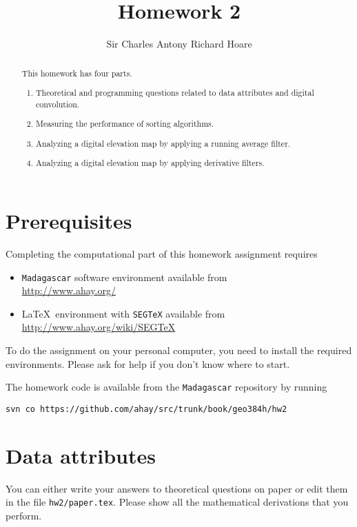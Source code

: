 \author{Sir Charles Antony Richard Hoare}
\title{Homework 2}

\begin{abstract}
  This homework has four parts. 
  \begin{enumerate}
  \item Theoretical and programming questions related to data attributes and digital convolution.  
  \item Measuring the performance of sorting algorithms.
  \item Analyzing a digital elevation map by applying a running average filter.
  \item Analyzing a digital elevation map by applying derivative filters.
  \end{enumerate}
\end{abstract}

\section{Prerequisites}

Completing the computational part of this homework assignment requires
\begin{itemize}
\item \texttt{Madagascar} software environment available from \\
\url{http://www.ahay.org/}
\item \LaTeX\ environment with \texttt{SEGTeX} available from \\ 
\url{http://www.ahay.org/wiki/SEGTeX}
\end{itemize}
To do the assignment on your personal computer, you need to install
the required environments. Please ask for help if you don't know where
to start.

The homework code is available from the \texttt{Madagascar} repository
by running
\begin{verbatim}
svn co https://github.com/ahay/src/trunk/book/geo384h/hw2
\end{verbatim}

\section{Data attributes}

You can either write your answers to theoretical questions on paper or
edit them in the file \texttt{hw2/paper.tex}. Please show all the
mathematical derivations that you perform.

